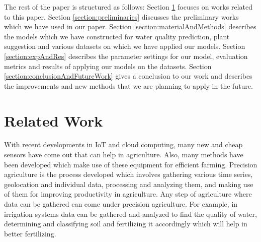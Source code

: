 The rest of the paper is structured as follows: Section \ref{section:realtedWork} focuses on works related to this paper. Section \ref{section:preliminaries} discusses the preliminary works which we have used in our paper. Section \ref{section:materialAndMethods} describes the models which we have constructed for water quality prediction, plant suggestion and various datasets on which we have applied our models. Section \ref{section:expAndRes} describes the parameter settings for our model, evaluation metrics and results of applying our models on the datasets. Section \ref{section:conclusionAndFutureWork} gives a conclusion to our work and describes the improvements and new methods that we are planning to apply in the future.  


\section{Related Work}
\label{section:realtedWork}
With recent developments in IoT and cloud computing, many new and cheap sensors have come out that can help in agriculture. Also, many methods have been developed which make use of these equipment for efficient farming. Precision agriculture\cite{article:precisionAgriculture} is the process developed which involves gathering various time series, geolocation and individual data, processing and analyzing them, and making use of them for improving productivity in agriculture. Any step of agriculture where data can be gathered can come under precision agriculture. For example, in irrigation systems data  can be gathered and analyzed to find the quality of water, determining and classifying soil and fertilizing it accordingly which will help in better fertilizing. 

